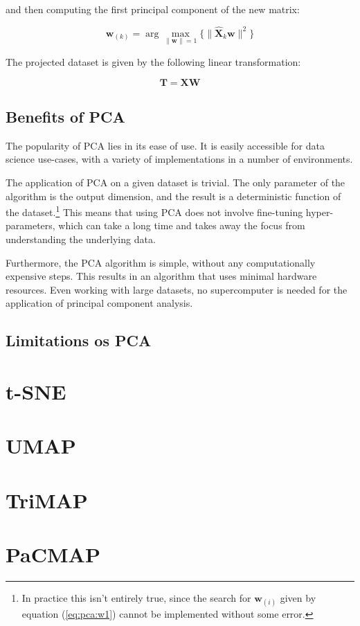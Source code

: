 and then computing the first principal component of the new matrix:

\begin{equation}
	\mathbf{w}_{(k)}=\arg\max_{\lVert \mathbf{w} \rVert = 1}{\Bigg\{ \lVert \mathbf{\hat {X}}_{k}\mathbf{w} \rVert ^2 \Bigg\} }
	\label{eq:pca:wk}
\end{equation}

The projected dataset is given by the following linear transformation:

\begin{equation}
	\mathbf{T} = \mathbf{XW}
	\label{eq:pca:t}
\end{equation}

\subsection{Benefits of PCA}\label{subsec:benefits-of-pca}

The popularity of PCA lies in its ease of use. It is easily accessible for data science use-cases, with a variety of implementations in a number of environments.

The application of PCA on a given dataset is trivial. The only parameter of the algorithm is the output dimension, and the result is a deterministic function of the dataset.\footnote{In practice this isn't entirely true, since the search for $\mathbf{w}_{(i)}$ given by equation (\ref{eq:pca:w1}) cannot be implemented without some error.} This means that using PCA does not involve fine-tuning hyper-parameters, which can take a long time and takes away the focus from understanding the underlying data.

Furthermore, the PCA algorithm is simple, without any computationally expensive steps. This results in an algorithm that uses minimal hardware resources. Even working with large datasets, no supercomputer is needed for the application of principal component analysis.

\subsection{Limitations os PCA}\label{subsec:limitations-os-pca}


\section{t-SNE}\label{sec:t-sne}


\section{UMAP}\label{sec:umap}


\section{TriMAP}\label{sec:trimap}


\section{PaCMAP}\label{sec:pacmap}


